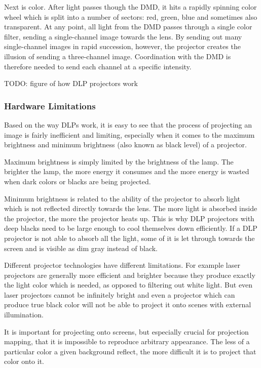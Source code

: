 Next is color. After light passes though the DMD, it hits a rapidly spinning color wheel which is split into a number of sectors: red, green, blue and sometimes also transparent. At any point, all light from the DMD passes through a single color filter, sending a single-channel image towards the lens. By sending out many single-channel images in rapid succession, however, the projector creates the illusion of sending a three-channel image. Coordination with the DMD is therefore needed to send each channel at a specific intensity.

{\color{red} TODO: figure of how DLP projectors work}

\subsubsection{Hardware Limitations}
\label{section:background-projection_mapping-projectors-limitations}

Based on the way DLPs work, it is easy to see that the process of projecting an image is fairly inefficient and limiting, especially when it comes to the maximum brightness and minimum brightness (also known as black level) of a projector.

Maximum brightness is simply limited by the brightness of the lamp. The brighter the lamp, the more energy it consumes and the more energy is wasted when dark colors or blacks are being projected.

Minimum brightness is related to the ability of the projector to absorb light which is not reflected directly towards the lens. The more light is absorbed inside the projector, the more the projector heats up. This is why DLP projectors with deep blacks need to be large enough to cool themselves down efficiently. If a DLP projector is not able to absorb all the light, some of it is let through towards the screen and is visible as dim gray instead of black.

Different projector technologies have different limitations. For example laser projectors are generally more efficient and brighter because they produce exactly the light color which is needed, as opposed to filtering out white light. But even laser projectors cannot be infinitely bright and even a projector which can produce true black color will not be able to project it onto scenes with external illumination.

It is important for projecting onto screens, but especially crucial for projection mapping, that it is impossible to reproduce arbitrary appearance. The less of a particular color a given background reflect, the more difficult it is to project that color onto it.

